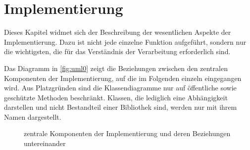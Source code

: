 \chapter{Implementierung}
Dieses Kapitel widmet sich der Beschreibung der wesentlichen Aspekte der Implementierung.
Dazu ist nicht jede einzelne Funktion aufgeführt, sondern nur die wichtigsten, die für das Verständnis der Verarbeitung erforderlich sind.

Das Diagramm in \autoref{fig:uml0} zeigt die Beziehungen zwischen den zentralen Komponenten der Implementierung, auf die im Folgenden einzeln eingegangen wird.
Aus Platzgründen sind die Klassendiagramme nur auf öffentliche sowie geschützte Methoden beschränkt.
Klassen, die lediglich eine Abhängigkeit darstellen und nicht Bestandteil einer Bibliothek sind, werden nur mit ihrem Namen dargestellt.

\begin{figure}[H]
  \centering
  \caption[zentrale Komponenten der Implementierung]{zentrale Komponenten der Implementierung und deren Beziehungen untereinander}
  \label{fig:uml0}
\end{figure}












